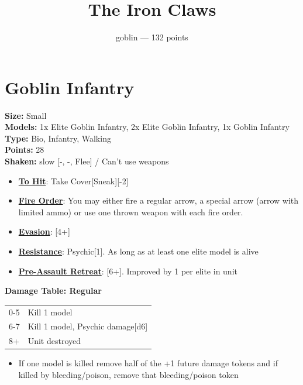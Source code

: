 \documentclass[a4paper,12pt]{article}
\title{The Iron Claws}
\author{goblin --- 132 points}
\begin{document}
\maketitle
\setcounter{tocdepth}{1}
\tableofcontents


\section{Goblin Infantry}

\textbf{Size:} Small \\
\textbf{Models:} 1x Elite Goblin Infantry, 2x Elite Goblin Infantry, 1x Goblin Infantry \\
\textbf{Type:} Bio, Infantry, Walking \\
\textbf{Points:} 28 \\
\textbf{Shaken:} slow [-, -, Flee] / Can't use weapons

\begin{itemize}
\item \textbf{\hyperref[rule-special-to-hit]{To Hit}}: Take Cover[Sneak][-2]
\item \textbf{\hyperref[rule-special-fire-order]{Fire Order}}: You may either fire a regular arrow, a special arrow (arrow with limited ammo) or use one thrown weapon with each fire order.
\item \textbf{\hyperref[rule-special-evasion]{Evasion}}: [4+]
\item \textbf{\hyperref[rule-special-resistance]{Resistance}}: Psychic[1]. As long as at least one elite model is alive
\item \textbf{\hyperref[rule-special-pre-assault-retreat]{Pre-Assault Retreat}}: [6+]. Improved by 1 per elite in unit
\end{itemize}


\noindent\textbf{Damage Table: Regular}

\begin{tabular}{ll}
0-5 & Kill 1 model \\
6-7 & Kill 1 model, Psychic damage[d6] \\
8+ & Unit destroyed \\
\end{tabular}
\begin{itemize}
\item If one model is killed remove half of the +1 future damage tokens and if killed by bleeding/poison, remove that bleeding/poison token
\end{itemize}
\vspace{1ex}
\end{document}
